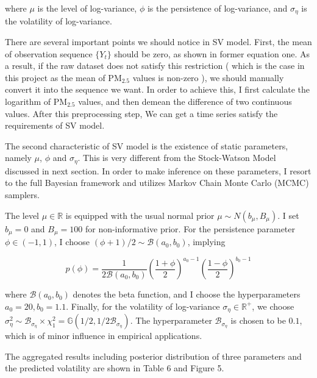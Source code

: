 \documentclass[letterpaper]{article}
\begin{document}
\noindent where $\mu$ is the level of log-variance, $\phi$ is the persistence of log-variance, and $\sigma_{\eta}$ is the volatility of log-variance.

There are several important points we should notice in SV model. First, the mean of observation sequence $\{ Y_{t} \}$ should be zero, as shown in former equation one. As a result, if the raw dataset does not satisfy this restriction ( which is the case in this project as the mean of $\text{PM}_{2.5}$ values is non-zero ), we should manually convert it into the sequence we want. In order to achieve this, I first calculate the logarithm of $\text{PM}_{2.5}$ values, and then demean the difference of two continuous values. After this preprocessing step, We can get a time series satisfy the requirements of SV model.

The second characteristic of SV model is the existence of static parameters, namely $\mu$, $\phi$ and $\sigma_{\eta}$. This is very different from the Stock-Watson Model discussed in next section. In order to make inference on these parameters, I resort to the full Bayesian framework and utilizes Markov Chain Monte Carlo (MCMC) samplers. 

The level $\mu \in \mathbb{R}$ is equipped with the usual normal prior $\mu \sim N(b_{\mu}, B_{\mu})$. I set $b_{\mu} = 0 $ and $B_{\mu} = 100$ for non-informative prior. For the persistence parameter $\phi \in (-1, 1)$, I choose $(\phi + 1) /2  \sim \mathcal{B}(a_{0}, b_{0})$, implying 

$$ p(\phi) = \frac{1}{2\mathcal{B}(a_{0},b_{0})} \left( \frac{1+\phi}{2} \right)^{a_{0}-1} \left( \frac{1-\phi}{2} \right)^{b_{0}-1}  $$

\noindent where $\mathcal{B}(a_{0},b_{0})$ denotes the beta function, and I choose the hyperparameters $a_{0} = 20, b_{0} = 1.1$. Finally, for the volatility of log-variance $\sigma_{\eta} \in \mathbb{R}^{+}$, we choose $\sigma_{\eta}^{2} \sim \mathcal{B}_{\sigma_{\eta}} \times \chi_{1}^{2} = \mathbb{G}(1/2 , 1/2\mathcal{B}_{\sigma_{\eta}})  $. The hyperparameter $\mathcal{B}_{\sigma_{\eta}}$ is chosen to be $0.1$, which is of minor influence in empirical applications. 

The aggregated results including posterior distribution of three parameters and the predicted volatility are shown in Table 6 and Figure 5.  
\end{document}
